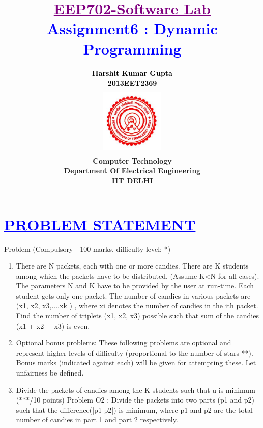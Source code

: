 \documentclass[a4paper,12pt]{report}
\title{\bfseries\huge \textcolor{purple}{\underline {EEP702-Software Lab}} \\{\textcolor{blue}{Assignment6 : Dynamic Programming}}}
\author{\bfseries\large\textcolor{black}  {Harshit Kumar Gupta}\\ {\textcolor{black} {2013EET2369 }}\\
\includegraphics[width=3cm,height=3.4cm]{./iit.png}\\\noindent Computer Technology\\
\noindent Department Of Electrical Engineering\\IIT DELHI}
\begin{document}
\maketitle
\tableofcontents


\chapter{\textcolor{blue}{\underline {PROBLEM STATEMENT}}}

Problem (Compulsory - 100 marks, difficulty level: *)
 \begin{enumerate}
\item There are N packets, each with one or more candies. There are K students among 
which the packets have to be distributed. (Assume K<N for all cases). The 
parameters N and K have to be provided by the user at run-time. Each student 
gets only one packet. The number of candies in various packets are 
(x1, x2, x3,....xk ) , where xi denotes the number of candies in the ith packet.
Find the number of triplets (x1, x2, x3) possible such that sum of the candies 
(x1 + x2 + x3) is even.\\



\item Optional bonus problems:
These following problems are optional and represent higher levels of difficulty
(proportional to the number of stars **). Bonus marks (indicated against each) 
will be given for attempting these.
Let unfairness be defined.



\item Divide the packets of candies among the K students such that u is minimum
(***/10 points) Problem O2 : Divide the packets into two parts (p1 and p2) such
that the difference(|p1-p2|) is minimum, where p1 and p2 are the total number of 
candies in part 1 and part 2 respectively.
\end{enumerate}
\end{document}
